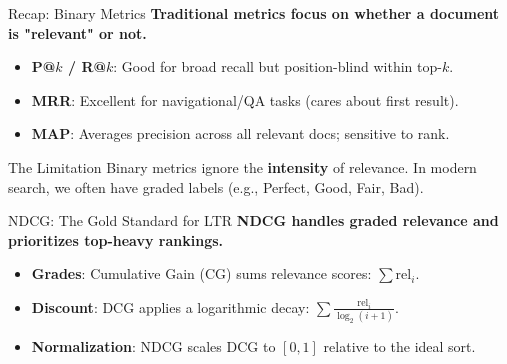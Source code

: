\documentclass[aspectratio=169]{beamer}
\newif\ifanimated
\newcommand{\cpause}{\ifanimated\pause\fi}
\begin{document}
\begin{frame}{Recap: Binary Metrics}
\textbf{Traditional metrics focus on whether a document is "relevant" or not.}

\vspace{0.8em}
\begin{itemize}
    \item \textbf{P@$k$ / R@$k$}: Good for broad recall but position-blind within top-$k$.
    \item \textbf{MRR}: Excellent for navigational/QA tasks (cares about first result).
    \item \textbf{MAP}: Averages precision across all relevant docs; sensitive to rank.
\end{itemize}\cpause

\vspace{1em}
\begin{alertblock}{The Limitation}
Binary metrics ignore the \textbf{intensity} of relevance. In modern search, we often have graded labels (e.g., Perfect, Good, Fair, Bad).
\end{alertblock}
\end{frame}

\begin{frame}{NDCG: The Gold Standard for LTR}
\textbf{NDCG handles graded relevance and prioritizes top-heavy rankings.}

\vspace{0.8em}
\begin{itemize}
    \item \textbf{Grades}: Cumulative Gain (CG) sums relevance scores: $\sum \text{rel}_i$.
    \item \textbf{Discount}: DCG applies a logarithmic decay: $\sum \frac{\text{rel}_i}{\log_2(i+1)}$.
    \item \textbf{Normalization}: NDCG scales DCG to $[0, 1]$ relative to the ideal sort.
\end{itemize}\cpause

\vspace{0.5em}
\begin{center}
\end{center}
\end{frame}
\end{document}
